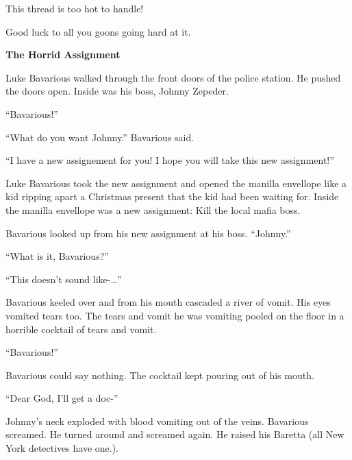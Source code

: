  





This thread is too hot to handle!



Good luck to all you goons going hard at it. 

 





{\bf The Horrid Assignment}



Luke Bavarious walked through the front doors of the police
station. He pushed the doors open. Inside was his boss, Johnny
Zepeder.



``Bavarious!''

``What do you want Johnny.'' Bavarious said.

``I have a new assignement for you! I hope you will take this new
assignment!''



Luke Bavarious took the new assignment and opened the manilla
envellope like a kid ripping apart a Christmas present that the kid
had been waiting for. Inside the manilla envellope was a new
assignment: Kill the local mafia boss.



Bavarious looked up from his new assignment at his boss.
``Johnny.''



``What is it, Bavarious?''

``This doesn't sound like-{\ldots}''



Bavarious keeled over and from his mouth cascaded a river of vomit.
His eyes vomited tears too. The tears and vomit he was vomiting
pooled on the floor in a horrible cocktail of tears and
vomit.



``Bavarious!''



Bavarious could say nothing. The cocktail kept pouring out of his
mouth.



``Dear God, I'll get a doc-''



Johnny's neck exploded with blood vomiting out of the veins.
Bavarious screamed. He turned around and screamed again. He raised
his Baretta (all New York detectives have one.).



